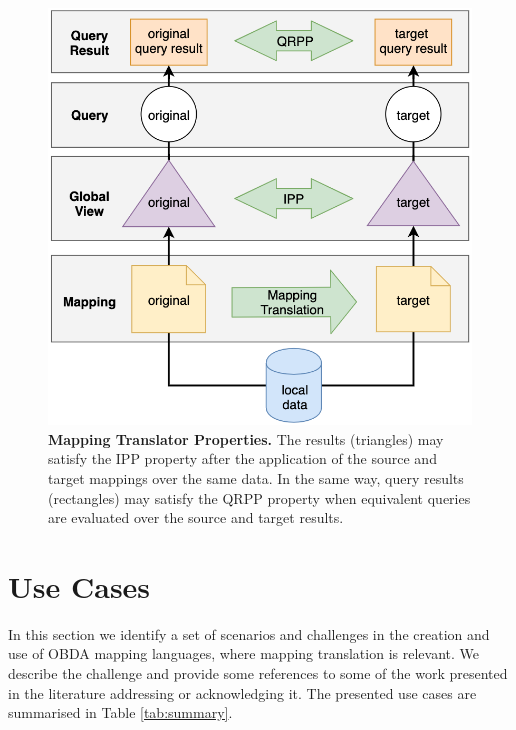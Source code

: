 \begin{figure}[!ht]
    \centering
    \includegraphics[width=0.6\columnwidth]{./figures/mapping-translator.png}
    \caption{\textbf{Mapping Translator Properties.} The results (triangles) may satisfy the IPP property after the application of the source and target mappings over the same data. In the same way, query results (rectangles) may satisfy the QRPP property when equivalent queries are evaluated over the source and target results.}
    \label{fig:mt}
\end{figure}


\section{Use Cases}
In this section we identify a set of scenarios and challenges in the creation and use of OBDA mapping languages, where mapping translation is relevant. We describe the challenge and provide some references to some of the work presented in the literature addressing or acknowledging it. The presented use cases are summarised in Table \ref{tab:summary}.

\begin{table}[h]
\centering
\caption{Summary of mapping translation approaches}
\label{tab:summary}
\end{table}



